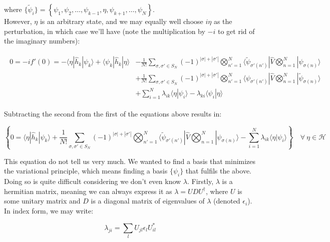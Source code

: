 \documentclass[10pt]{report}
\begin{document}
	where $\{\widetilde{\psi}_i\} = \left\{\psi_1,\psi_2,\ldots,\psi_{k-1},\eta,\psi_{k+1},\ldots,\psi_N\right\}$.\\
	However, $\eta$ is an arbitrary state, and we may equally well choose $i\eta$ as the perturbation, in which case we'll have (note the multiplication by $-i$ to get rid of the imaginary numbers):
	
	\begin{align}
		\begin{split}
			0 = -if'(0) =  -\langle\eta|\hat{h}_k|\psi_k\rangle + \langle\psi_k|\hat{h}_k|\eta\rangle &- \frac{1}{N!}\sum_{\sigma,\sigma'\in S_N} (-1)^{|\sigma|+|\sigma'|}\bigotimes_{n'=1}^N \langle\widetilde{\psi}_{\sigma'(n')}|\hat{V}\bigotimes_{n=1}^N |\psi_{\sigma(n)}\rangle\\
			&+ \frac{1}{N!}\sum_{\sigma,\sigma'\in S_N} (-1)^{|\sigma|+|\sigma'|}\bigotimes_{n'=1}^N \langle\psi_{\sigma'(n')}|\hat{V}\bigotimes_{n=1}^N |\widetilde{\psi}_{\sigma(n)}\rangle\\
			&+ \sum_{i=1}^N \lambda_{ik}\langle\eta|\psi_i\rangle - \lambda_{ki}\langle\psi_i|\eta\rangle
		\end{split}
	\end{align}
	
	Subtracting the second from the first of the equations above results in:
	
	\begin{equation}
		\left\{0 = \langle\eta|\hat{h}_k|\psi_k\rangle + \frac{1}{N!}\sum_{\sigma,\sigma'\in S_N} (-1)^{|\sigma|+|\sigma'|}\bigotimes_{n'=1}^N \langle\widetilde{\psi}_{\sigma'(n')}|\hat{V}\bigotimes_{n=1}^N |\psi_{\sigma(n)}\rangle
		- \sum_{i=1}^N \lambda_{ik}\langle\eta|\psi_i\rangle\right\} \quad \forall\:\eta\in\mathcal{H}
	\end{equation}
	
	This equation do not tell us very much. We wanted to find a basis that minimizes the variational principle, which means finding a basis $\{\psi_i\}$ that fulfils the above. Doing so is quite difficult considering we don't even know $\lambda$. Firstly, $\lambda$ is a hermitian matrix, meaning we can always express it as $\lambda = UDU^\dagger$, where $U$ is some unitary matrix and $D$ is a diagonal matrix of eigenvalues of $\lambda$ (denoted $\epsilon_i$). In index form, we may write:
	
	\begin{equation}
		\lambda_{ji} = \sum_l U_{jl}\epsilon_lU_{il}^*
	\end{equation}
	
\end{document}
